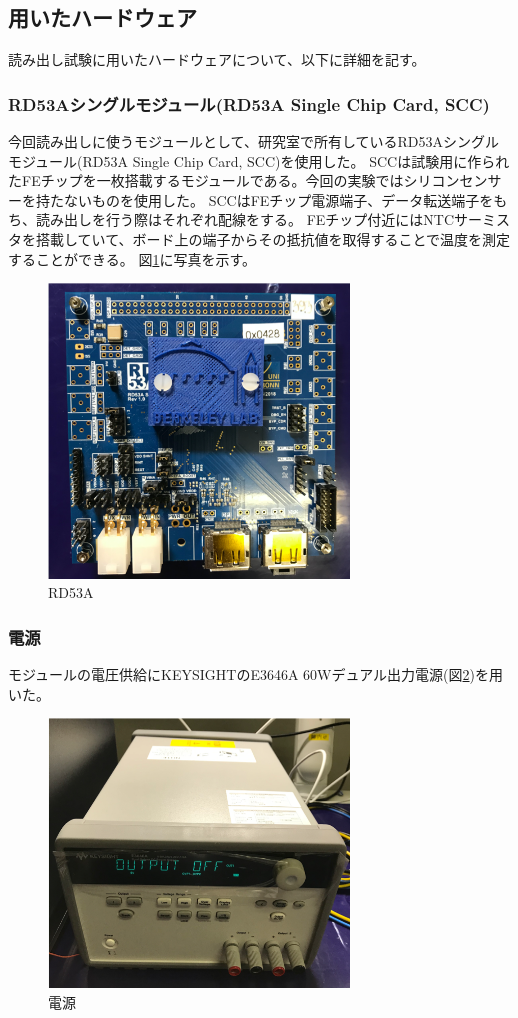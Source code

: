 \subsection{用いたハードウェア}
読み出し試験に用いたハードウェアについて、以下に詳細を記す。

\subsubsection{RD53Aシングルモジュール(RD53A Single Chip Card, SCC)}
今回読み出しに使うモジュールとして、研究室で所有しているRD53Aシングルモジュール(RD53A Single Chip Card, SCC)を使用した。
SCCは試験用に作られたFEチップを一枚搭載するモジュールである。今回の実験ではシリコンセンサーを持たないものを使用した。
SCCはFEチップ電源端子、データ転送端子をもち、読み出しを行う際はそれぞれ配線をする。
FEチップ付近にはNTCサーミスタを搭載していて、ボード上の端子からその抵抗値を取得することで温度を測定することができる。
図\ref{demo_rd53a_SCC}に写真を示す。

\begin{figure}[h]\centering
\includegraphics[width=8cm]{rd53a_SCC}
\caption[RD53A]{RD53A}
\label{demo_rd53a_SCC}
\end{figure}

\subsubsection{電源}
モジュールの電圧供給にKEYSIGHTのE3646A 60Wデュアル出力電源\cite{1}(図\ref{demo_power_supply})を用いた。
\begin{figure}[h]\centering
\includegraphics[width=8cm]{power_supply}
\caption[電源]{電源}
\label{demo_power_supply}
\end{figure}

